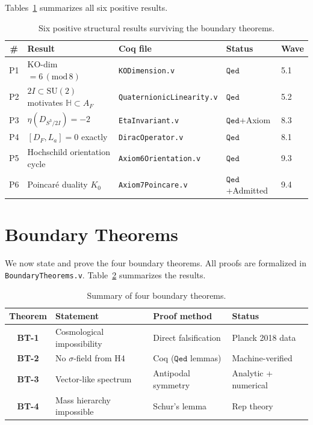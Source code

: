 \documentclass[12pt,a4paper]{article}
\newcommand{\AF}{A_F}
\newcommand{\TwoI}{2I}
\newcommand{\BT}[1]{\textbf{BT-#1}}
\newcommand{\Qed}{\texttt{Qed}}
\begin{document}
Tables~\ref{tab:positive} summarizes all six positive results.

\begin{table}[htbp]
  \centering
  \caption{Six positive structural results surviving the boundary theorems.}
  \label{tab:positive}
  \begin{tabular}{cllll}
    \toprule
    \# & Result & Coq file & Status & Wave \\
    \midrule
    P1 & KO-dim \(= 6\,(\mathrm{mod}\,8)\) & \texttt{KODimension.v} & \(\Qed\) & 5.1 \\
    P2 & \(\TwoI \subset \mathrm{SU}(2)\) motivates \(\mathbb{H} \subset \AF\) &
        \texttt{QuaternionicLinearity.v} & \(\Qed\) & 5.2 \\
    P3 & \(\eta(D_{S^3/\TwoI}) = -2\) & \texttt{EtaInvariant.v} & \(\Qed\)+Axiom & 8.3 \\
    P4 & \([D_F, L_a] = 0\) exactly & \texttt{DiracOperator.v} & \(\Qed\) & 8.1 \\
    P5 & Hochschild orientation cycle & \texttt{Axiom6Orientation.v} & \(\Qed\) & 9.3 \\
    P6 & Poincar\'e duality \(K_0\) & \texttt{Axiom7Poincare.v} & \(\Qed\)+Admitted & 9.4 \\
    \bottomrule
  \end{tabular}
\end{table}


\section{Boundary Theorems}
\label{sec:boundary}

We now state and prove the four boundary theorems. All proofs are formalized in
\texttt{BoundaryTheorems.v}. Table~\ref{tab:bt} summarizes the results.

\begin{table}[htbp]
  \centering
  \caption{Summary of four boundary theorems.}
  \label{tab:bt}
  \begin{tabular}{clll}
    \toprule
    Theorem & Statement & Proof method & Status \\
    \midrule
    \BT{1} & Cosmological impossibility & Direct falsification & Planck 2018 data \\
    \BT{2} & No \(\sigma\)-field from H4 & Coq (\(\Qed\) lemmas) & Machine-verified \\
    \BT{3} & Vector-like spectrum & Antipodal symmetry & Analytic + numerical \\
    \BT{4} & Mass hierarchy impossible & Schur's lemma & Rep theory \\
    \bottomrule
  \end{tabular}
\end{table}
\end{document}
